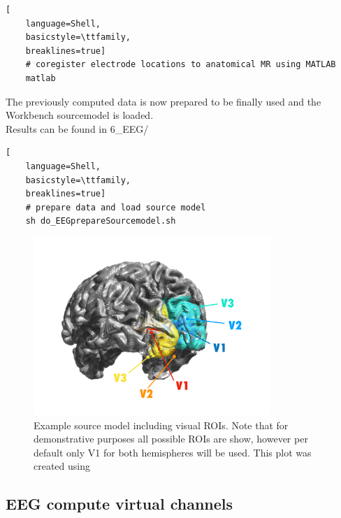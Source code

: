 \documentclass[12pt,a4paper]{scrartcl}
\begin{document}
\begin{lstlisting}[
    language=Shell,
    basicstyle=\ttfamily,
    breaklines=true]
    # coregister electrode locations to anatomical MR using MATLAB
    matlab
\end{lstlisting}
The previously computed data is now prepared to be finally used and the Workbench sourcemodel is loaded.\\

\noindent Results can be found in 6\_EEG/\\
\begin{lstlisting}[
    language=Shell,
    basicstyle=\ttfamily,
    breaklines=true]
    # prepare data and load source model
    sh do_EEGprepareSourcemodel.sh
\end{lstlisting}
\begin{figure}
\begin{center}
\includegraphics[width=0.8\textwidth]{exampleSourcemodel}
\caption[Example source model]{Example source model including visual ROIs. Note that for demonstrative purposes all possible ROIs are show, however per default only V1 for both hemispheres will be used. This plot was created using \texttt{}}
\label{fig:exampleSourcemodel}
\end{center}
\end{figure}
\FloatBarrier
\subsection{EEG compute virtual channels}
\end{document}
